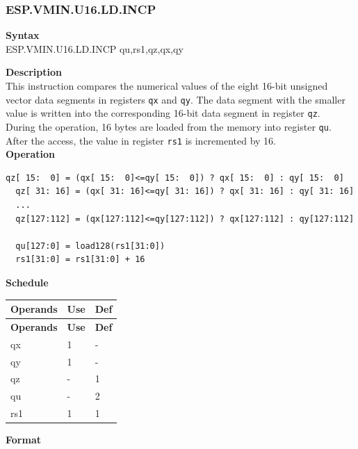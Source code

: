 \newpage
\subsubsection{ESP.VMIN.U16.LD.INCP}\label{instruction:ESPVMINU16LDINCP}
\textbf{Syntax}\\
ESP.VMIN.U16.LD.INCP qu,rs1,qz,qx,qy

\textbf{Description}\\
This instruction compares the numerical values of the eight 16-bit unsigned vector data segments in registers \lstinline{qx} and \lstinline{qy}. The data segment with the smaller value is written into the corresponding 16-bit data segment in register \lstinline{qz}.\\During the operation, 16 bytes are loaded from the memory into register \lstinline{qu}. After the access, the value in register \lstinline{rs1} is incremented by 16.\\
\textbf{Operation}
\begin{lstlisting}[escapeinside=`?]
  qz[ 15:  0] = (qx[ 15:  0]<=qy[ 15:  0]) ? qx[ 15:  0] : qy[ 15:  0]
  qz[ 31: 16] = (qx[ 31: 16]<=qy[ 31: 16]) ? qx[ 31: 16] : qy[ 31: 16]
  ...
  qz[127:112] = (qx[127:112]<=qy[127:112]) ? qx[127:112] : qy[127:112]

  qu[127:0] = load128(rs1[31:0])
  rs1[31:0] = rs1[31:0] + 16
\end{lstlisting}


\textbf{Schedule}\\
\begin{longtable}[c]{|l|l|l|}
    \hline
    \rowcolor{lightgray}
    \textbf{Operands} & \textbf{Use} & \textbf{Def} \\\hline
    \endfirsthead
    \hline
    \rowcolor{lightgray}
     \textbf{Operands} & \textbf{Use} & \textbf{Def} \\\hline
    \endhead
    \hline
    \endfoot

    qx & 1 & - \\\hline
  qy & 1 & - \\\hline
     qz & - & 1 \\\hline
     qu & - & 2 \\\hline
     rs1 & 1 & 1

\end{longtable}

\textbf{Format}\\

